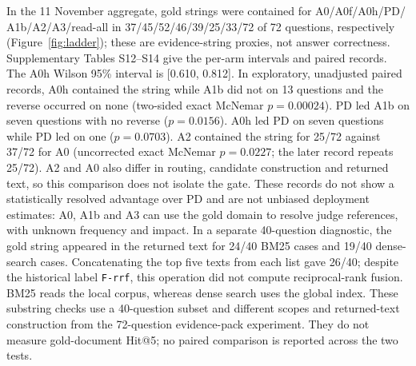 In the 11 November aggregate, gold strings were contained for A0/A0f/A0h/PD/
A1b/A2/A3/read-all in 37/45/52/46/39/25/33/72 of 72 questions, respectively
(Figure~\ref{fig:ladder}); these are evidence-string proxies, not answer
correctness. Supplementary Tables S12--S14 give the per-arm intervals and
paired records. The A0h Wilson 95\% interval is [0.610, 0.812]. In exploratory,
unadjusted paired records, A0h contained the string while A1b did not on 13
questions and the reverse occurred on none (two-sided exact McNemar
$p=0.00024$). PD led A1b on seven questions with no reverse
($p=0.0156$). A0h led PD on seven questions while PD led on one
($p=0.0703$). A2 contained the string for 25/72 against 37/72 for A0
(uncorrected exact McNemar $p=0.0227$; the later record repeats 25/72). A2 and
A0 also differ in routing, candidate construction and returned text, so this
comparison does not isolate the gate. These records do not show a statistically resolved advantage
over PD and are not unbiased deployment estimates: A0, A1b and A3 can use
the gold domain to resolve judge references, with unknown frequency and impact.
In a separate 40-question diagnostic, the gold string appeared in the
returned text for 24/40 BM25 cases and 19/40 dense-search cases. Concatenating
the top five texts from each list gave 26/40; despite the historical label
\texttt{F-rrf}, this operation did not compute reciprocal-rank fusion. BM25
reads the local corpus, whereas dense search uses the global index. These
substring checks use a 40-question subset and different scopes and returned-text
construction from the 72-question evidence-pack experiment. They do not measure
gold-document Hit@5; no paired comparison is reported across the two tests.

